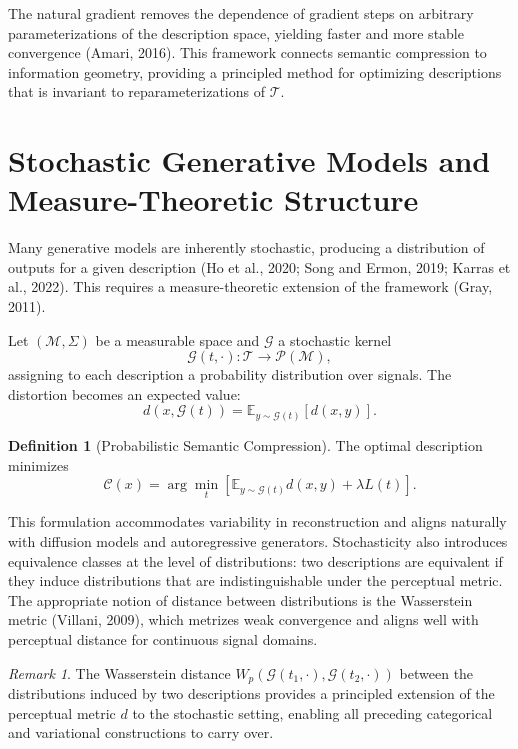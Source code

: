 \documentclass[11pt,a4paper]{article}
\theoremstyle{definition}
\newtheorem{definition}[theorem]{Definition}
\theoremstyle{remark}
\newtheorem{remark}[theorem]{Remark}
\begin{document}
The natural gradient removes the dependence of gradient steps on arbitrary parameterizations of the description space, yielding faster and more stable convergence (Amari, 2016). This framework connects semantic compression to information geometry, providing a principled method for optimizing descriptions that is invariant to reparameterizations of $\mathcal{T}$.

\section{Stochastic Generative Models and Measure-Theoretic Structure}
\label{sec:stochastic}

Many generative models are inherently stochastic, producing a distribution of outputs for a given description (Ho et al., 2020; Song and Ermon, 2019; Karras et al., 2022). This requires a measure-theoretic extension of the framework (Gray, 2011).

Let $(\mathcal{M}, \Sigma)$ be a measurable space and $\mathcal{G}$ a stochastic kernel
\[
\mathcal{G}(t, \cdot) : \mathcal{T} \to \mathcal{P}(\mathcal{M}),
\]
assigning to each description a probability distribution over signals. The distortion becomes an expected value:
\[
d(x, \mathcal{G}(t)) = \mathbb{E}_{y \sim \mathcal{G}(t)}[d(x,y)].
\]

\begin{definition}[Probabilistic Semantic Compression]
The optimal description minimizes
\[
\mathcal{C}(x) = \arg\min_t \left[ \mathbb{E}_{y \sim \mathcal{G}(t)} d(x,y) + \lambda L(t) \right].
\]
\end{definition}

This formulation accommodates variability in reconstruction and aligns naturally with diffusion models and autoregressive generators. Stochasticity also introduces equivalence classes at the level of distributions: two descriptions are equivalent if they induce distributions that are indistinguishable under the perceptual metric. The appropriate notion of distance between distributions is the Wasserstein metric (Villani, 2009), which metrizes weak convergence and aligns well with perceptual distance for continuous signal domains.

\begin{remark}
The Wasserstein distance $W_p(\mathcal{G}(t_1, \cdot), \mathcal{G}(t_2, \cdot))$ between the distributions induced by two descriptions provides a principled extension of the perceptual metric $d$ to the stochastic setting, enabling all preceding categorical and variational constructions to carry over.
\end{remark}
\end{document}
